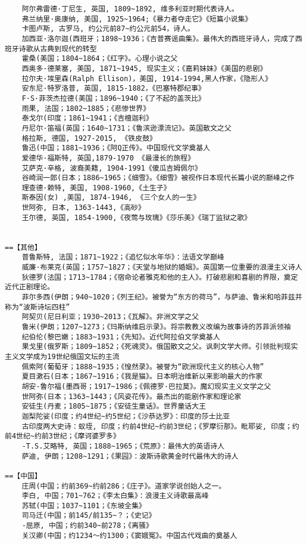 \documentclass[UTF8]{../RepresentationUniverse}
\begin{document}
\begin{lstlisting}
    阿尔弗雷德·丁尼生, 英国, 1809~1892, 维多利亚时期代表诗人。
    弗兰纳里·奥康纳, 美国, 1925~1964;《暴力者夺走它》《短篇小说集》
    卡图卢斯, 古罗马, 约公元前87~约公元前54，诗人。
    加西亚·洛尔迦(西班牙；1898~1936；《吉普赛谣曲集》。最伟大的西班牙诗人，完成了西班牙诗歌从古典到现代的转型
    霍桑(美国；1804~1864；《红字》。心理小说之父
    西奥多·德莱塞, 美国, 1871~1945, 现实主义；《嘉莉妹妹》《美国的悲剧》
    拉尔夫·埃里森(Ralph Ellison)，美国, 1914-1994,黑人作家，《隐形人》
    安东尼·特罗洛普, 英国, 1815-1882，《巴塞特郡纪事》
    F·S·菲茨杰拉德(美国；1896~1940；《了不起的盖茨比》
    雨果, 法国；1802~1885；《悲惨世界》
    泰戈尔(印度；1861~1941；《吉檀迦利》
    丹尼尔·笛福(英国；1640~1731；《鲁滨逊漂流记》。英国散文之父
    格拉斯, 德国, 1927-2015, 《铁皮鼓》
    鲁迅(中国；1881~1936；《阿Q正传》。中国现代文学奠基人
    爱德华·福斯特, 英国,1879-1970 《最漫长的旅程》
    艾萨克·辛格, 波裔美籍, 1904-1991《傻瓜吉姆佩尔》
    谷崎润一郎(日本；1886~1965；《细雪》。《细雪》被视作日本现代长篇小说的巅峰之作
    理查德·赖特, 美国, 1908-1960,《土生子》
    斯泰因(女) ,美国, 1874-1946, 《三个女人的一生》
    世阿弥, 日本, 1363-1443,《高砂》
    王尔德, 英国, 1854-1900,《夜莺与玫瑰》《莎乐美》《瑞丁监狱之歌》


==【其他】
    普鲁斯特, 法国；1871~1922；《追忆似水年华》：法语文学巅峰
    威廉·布莱克(英国；1757~1827；《天堂与地狱的婚姻》。英国第一位重要的浪漫主义诗人
    狄德罗(法国；1713~1784；《宿命论者雅克和他的主人》。打破悲剧和喜剧的界限，奠定近代正剧理论。
    菲尔多西(伊朗；940~1020；《列王纪》。被誉为“东方的荷马”，与萨迪、鲁米和哈菲兹并称为“波斯诗坛四柱”
    阿契贝(尼日利亚；1930~2013；《瓦解》。非洲文学之父
    鲁米(伊朗；1207~1273；《玛斯纳维启示录》。将宗教教义改编为故事诗的苏菲派领袖
    纪伯伦(黎巴嫩；1883~1931；《先知》。近代阿拉伯文学奠基人
    果戈里(俄罗斯；1809~1852；《死魂灵》。俄国散文之父。讽刺文学大师。引领批判现实主义文学成为19世纪俄国文坛的主流
    佩索阿(葡萄牙；1888~1935；《惶然录》。被誉为“欧洲现代主义的核心人物”
    夏目漱石(日本；1867~1916；《我是猫》。日本明治维新以来影响最大的作家
    胡安·鲁尔福(墨西哥；1917~1986；《佩德罗·巴拉莫》。魔幻现实主义文学之父
    世阿弥(日本；1363~1443；《风姿花传》。最杰出的能剧作家和理论家
    安徒生(丹麦；1805~1875；《安徒生童话》。世界童话大王
    迦梨陀娑(印度；约4世纪~约5世纪；《沙恭达罗》：印度的莎士比亚
    古印度两大史诗：蚁垤, 印度；约前4世纪~约前3世纪；《罗摩衍那》。毗耶娑, 印度；约前4世纪~约前3世纪；《摩诃婆罗多》
    -T.S.艾略特, 英国；1888~1965；《荒原》：最伟大的英语诗人
    萨迪, 伊朗；1208~1291；《果园》：波斯诗歌黄金时代最伟大的诗人
    
==【中国】
    庄周(中国；约前369~约前286；《庄子》。道家学说创始人之一。
    李白, 中国；701~762；《李太白集》：浪漫主义诗歌最高峰
    苏轼(中国；1037~1101；《东坡全集》
    司马迁(中国；前145/前135~？；《史记》
    -屈原, 中国；约前340~前278；《离骚》
    关汉卿(中国；约1234～约1300；《窦娥冤》。中国古代戏曲的奠基人


\end{lstlisting}
\end{document}
